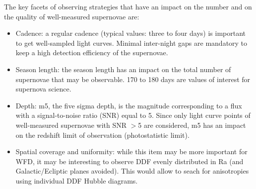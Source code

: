 \documentclass [11pt,a4paper]{article}
\begin{document}
The key facets of observing strategies that have an impact on the number and on the quality of well-measured supernovae are:
\begin{itemize}

\item Cadence: a regular cadence (typical values: three to four days) is important to get well-sampled light curves. Minimal inter-night gaps are mandatory to keep a high detection efficiency of the supernovae.
 \item Season length: the season length has an impact on the total number of supernovae that may be observable. 170 to 180 days are values of interest for supernova science. 
\item Depth: m5, the five sigma depth, is the magnitude corresponding to a flux with a signal-to-noise ratio (SNR) equal to 5. Since only light curve points of well-measured supernovae with SNR $>$5 are considered, m5 has an impact on the redshift limit of observation (photostatistic limit).  
 
\item Spatial coverage and uniformity: while this item may be more important for WFD, it may be interesting to observe DDF evenly distributed in Ra (and Galactic/Ecliptic planes avoided). This would allow to seach for anisotropies using individual DDF Hubble diagrams.

 \end{itemize}
\end{document}
